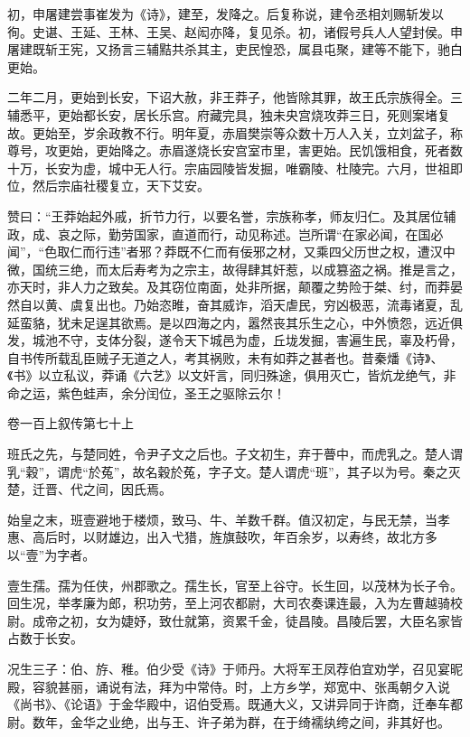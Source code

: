 \documentclass[12pt,UTF8]{ctexbook}
\begin{document}
初，申屠建尝事崔发为《诗》，建至，发降之。后复称说，建令丞相刘赐斩发以徇。史谌、王延、王林、王吴、赵闳亦降，复见杀。初，诸假号兵人人望封侯。申屠建既斩王宪，又扬言三辅黠共杀其主，吏民惶恐，属县屯聚，建等不能下，驰白更始。



二年二月，更始到长安，下诏大赦，非王莽子，他皆除其罪，故王氏宗族得全。三辅悉平，更始都长安，居长乐宫。府藏完具，独未央宫烧攻莽三日，死则案堵复故。更始至，岁余政教不行。明年夏，赤眉樊崇等众数十万人入关，立刘盆子，称尊号，攻更始，更始降之。赤眉遂烧长安宫室市里，害更始。民饥饿相食，死者数十万，长安为虚，城中无人行。宗庙园陵皆发掘，唯霸陵、杜陵完。六月，世祖即位，然后宗庙社稷复立，天下艾安。



赞曰：“王莽始起外戚，折节力行，以要名誉，宗族称孝，师友归仁。及其居位辅政，成、哀之际，勤劳国家，直道而行，动见称述。岂所谓“在家必闻，在国必闻”，“色取仁而行违”者邪？莽既不仁而有佞邪之材，又乘四父历世之权，遭汉中微，国统三绝，而太后寿考为之宗主，故得肆其奸惹，以成篡盗之祸。推是言之，亦天时，非人力之致矣。及其窃位南面，处非所据，颠覆之势险于桀、纣，而莽晏然自以黄、虞复出也。乃始恣睢，奋其威诈，滔天虐民，穷凶极恶，流毒诸夏，乱延蛮貉，犹未足逞其欲焉。是以四海之内，嚣然丧其乐生之心，中外愤怨，远近俱发，城池不守，支体分裂，遂令天下城邑为虚，丘垅发掘，害遍生民，辜及朽骨，自书传所载乱臣贼子无道之人，考其祸败，未有如莽之甚者也。昔秦燔《诗》、《书》以立私议，莽诵《六艺》以文奸言，同归殊途，俱用灭亡，皆炕龙绝气，非命之运，紫色蛙声，余分闰位，圣王之驱除云尔！





卷一百上叙传第七十上



班氏之先，与楚同姓，令尹子文之后也。子文初生，弃于瞢中，而虎乳之。楚人谓乳“穀”，谓虎“於菟”，故名穀於菟，字子文。楚人谓虎“班”，其子以为号。秦之灭楚，迁晋、代之间，因氏焉。



始皇之末，班壹避地于楼烦，致马、牛、羊数千群。值汉初定，与民无禁，当孝惠、高后时，以财雄边，出入弋猎，旌旗鼓吹，年百余岁，以寿终，故北方多以“壹”为字者。



壹生孺。孺为任侠，州郡歌之。孺生长，官至上谷守。长生回，以茂林为长子令。回生况，举孝廉为郎，积功劳，至上河农都尉，大司农奏课连最，入为左曹越骑校尉。成帝之初，女为婕妤，致仕就第，资累千金，徒昌陵。昌陵后罢，大臣名家皆占数于长安。



况生三子：伯、斿、稚。伯少受《诗》于师丹。大将军王凤荐伯宜劝学，召见宴昵殿，容貌甚丽，诵说有法，拜为中常侍。时，上方乡学，郑宽中、张禹朝夕入说《尚书》、《论语》于金华殿中，诏伯受焉。既通大义，又讲异同于许商，迁奉车都尉。数年，金华之业绝，出与王、许子弟为群，在于绮襦纨绔之间，非其好也。
\end{document}
